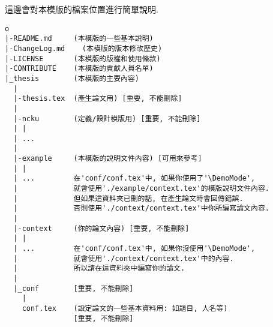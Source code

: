 
這邊會對本模版的檔案位置進行簡單說明.

\EmptyLine
\begin{fmpage}{\textwidth}
\begin{verbatim}
o
|-README.md     (本模版的一些基本說明)
|-ChangeLog.md    (本模版的版本修改歷史)
|-LICENSE       (本模版的版權和使用條款)
|-CONTRIBUTE    (本模版的貢獻人員名單)
|_thesis        (本模版的主要內容)
  |
  |-thesis.tex  (產生論文用) [重要, 不能刪除]
  | 
  |-ncku        (定義/設計模版用) [重要, 不能刪除]
  | |
  | ...
  |
  |-example     (本模版的說明文件內容) [可用來參考]
  | |
  | ...         在'conf/conf.tex'中, 如果你使用了'\DemoMode',
  |             就會使用'./example/context.tex'的模版說明文件內容.
  |             但如果這資料夾已刪的話, 在產生論文時會回傳錯誤.
  |             否則使用'./context/context.tex'中你所編寫論文內容.
  |
  |-context     (你的論文內容) [重要, 不能刪除]
  | |
  | ...         在'conf/conf.tex'中, 如果你沒使用'\DemoMode',
  |             就會使用'./context/context.tex'中的內容.
  |             所以請在這資料夾中編寫你的論文.
  |
  |_conf        [重要, 不能刪除]
    |
    conf.tex    (設定論文的一些基本資料用: 如題目, 人名等)
                [重要, 不能刪除]
\end{verbatim}
\end{fmpage}

